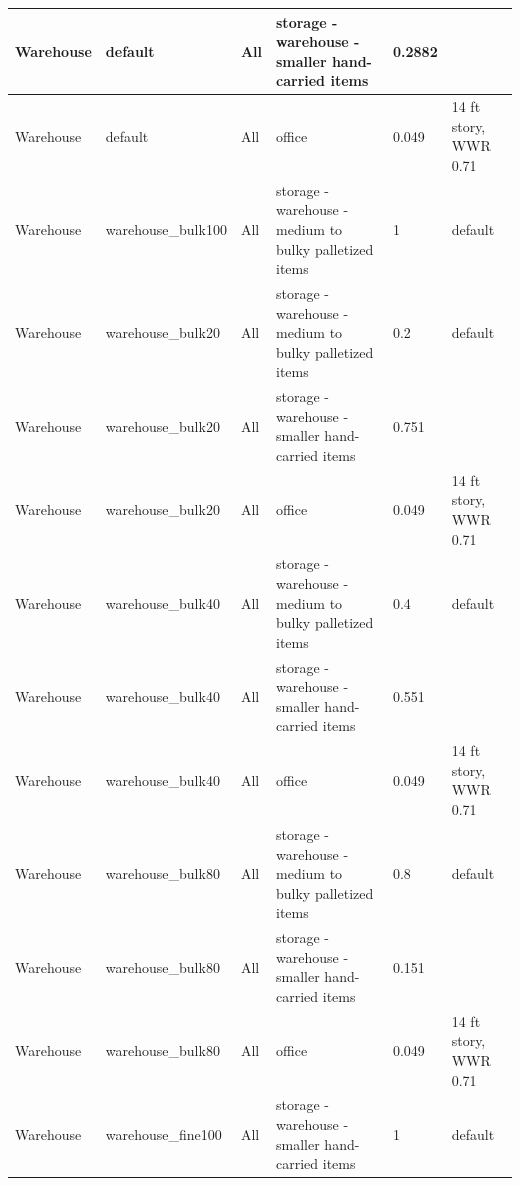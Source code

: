 \begin{center}
\begin{longtable}{|p{1.0in}|p{1.05in}|p{1.1in}|p{1.9in}|p{0.55in}|p{0.95in}|}
Warehouse & default & All & storage - warehouse - smaller hand-carried items & 0.2882 &  \\ \hline
Warehouse & default & All & office & 0.049 & 14 ft story, WWR 0.71 \\ \hline
Warehouse & warehouse\_bulk100 & All & storage - warehouse - medium to bulky palletized items & 1 & default \\ \hline
Warehouse & warehouse\_bulk20 & All & storage - warehouse - medium to bulky palletized items & 0.2 & default \\ \hline
Warehouse & warehouse\_bulk20 & All & storage - warehouse - smaller hand-carried items & 0.751 &  \\ \hline
Warehouse & warehouse\_bulk20 & All & office & 0.049 & 14 ft story, WWR 0.71 \\ \hline
Warehouse & warehouse\_bulk40 & All & storage - warehouse - medium to bulky palletized items & 0.4 & default \\ \hline
Warehouse & warehouse\_bulk40 & All & storage - warehouse - smaller hand-carried items & 0.551 &  \\ \hline
Warehouse & warehouse\_bulk40 & All & office & 0.049 & 14 ft story, WWR 0.71 \\ \hline
Warehouse & warehouse\_bulk80 & All & storage - warehouse - medium to bulky palletized items & 0.8 & default \\ \hline
Warehouse & warehouse\_bulk80 & All & storage - warehouse - smaller hand-carried items & 0.151 &  \\ \hline
Warehouse & warehouse\_bulk80 & All & office & 0.049 & 14 ft story, WWR 0.71 \\ \hline
Warehouse & warehouse\_fine100 & All & storage - warehouse - smaller hand-carried items & 1 & default \\ \hline
\end{longtable}
\end{center}
